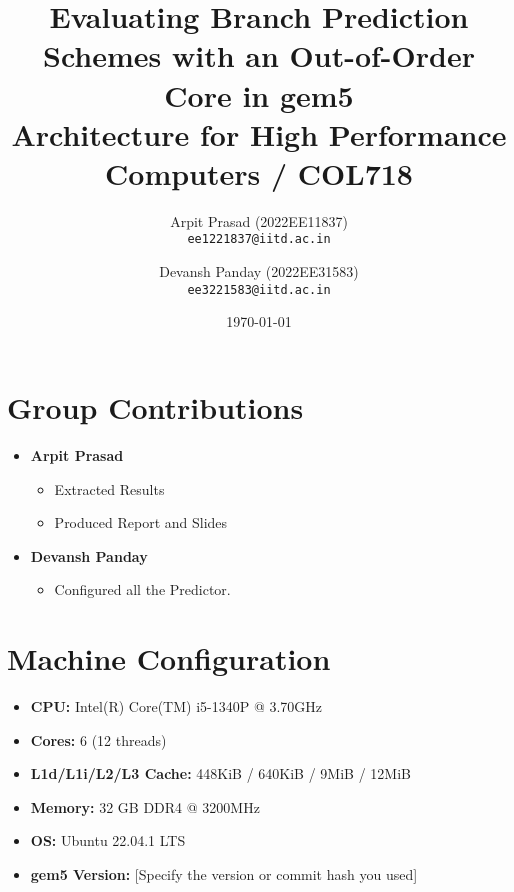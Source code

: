 \documentclass[11pt, a4paper]{article}
\begin{document}
\title{
    \textbf{Evaluating Branch Prediction Schemes with an Out-of-Order Core in gem5} \\
    \vspace{0.5cm}
    \large Architecture for High Performance Computers / COL718
}
\author{
    Arpit Prasad (2022EE11837) \\
    \texttt{ee1221837@iitd.ac.in}
    \and
    Devansh Panday (2022EE31583) \\
    \texttt{ee3221583@iitd.ac.in}
}
\date{\today}
\maketitle
\thispagestyle{empty} %
\newpage

\section{Group Contributions}
\begin{itemize}
    \item \textbf{Arpit Prasad}
    \begin{itemize}
        \item Extracted Results
        \item Produced Report and Slides
    \end{itemize}
    \item \textbf{Devansh Panday}
    \begin{itemize}
        \item Configured all the Predictor.
    \end{itemize}
\end{itemize}

\section{Machine Configuration}
\begin{itemize}
    \item \textbf{CPU:} Intel(R) Core(TM) i5-1340P @ 3.70GHz
    \item \textbf{Cores:} 6 (12 threads)
    \item \textbf{L1d/L1i/L2/L3 Cache:} 448KiB / 640KiB / 9MiB / 12MiB
    \item \textbf{Memory:} 32 GB DDR4 @ 3200MHz
    \item \textbf{OS:} Ubuntu 22.04.1 LTS
    \item \textbf{gem5 Version:} [Specify the version or commit hash you used]
\end{itemize}
\end{document}
